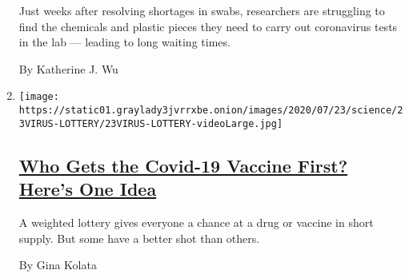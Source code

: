 \begin{enumerate}
  Just weeks after resolving shortages in swabs, researchers are
  struggling to find the chemicals and plastic pieces they need to carry
  out coronavirus tests in the lab --- leading to long waiting times.

  By Katherine J. Wu
\item
  \texttt{[image: https://static01.graylady3jvrrxbe.onion/images/2020/07/23/science/23VIRUS-LOTTERY/23VIRUS-LOTTERY-videoLarge.jpg]}

  \hypertarget{who-gets-the-covid-19-vaccine-first-heres-one-idea}{%
  \subsection{\texorpdfstring{\href{/2020/07/23/health/coronavirus-vaccine-allocation.html}{Who
  Gets the Covid-19 Vaccine First? Here's One
  Idea}}{Who Gets the Covid-19 Vaccine First? Here's One Idea}}\label{who-gets-the-covid-19-vaccine-first-heres-one-idea}}

  A weighted lottery gives everyone a chance at a drug or vaccine in
  short supply. But some have a better shot than others.

  By Gina Kolata
\end{enumerate}

